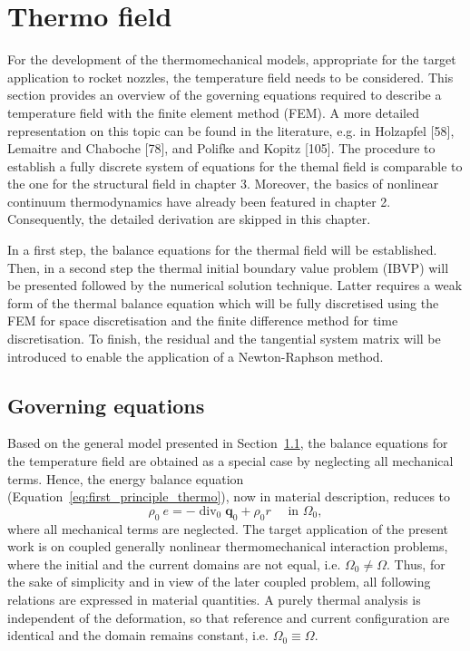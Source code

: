 \chapter{Thermo field}

For the development of the thermomechanical models, appropriate for the target application to rocket nozzles, the temperature field needs to be considered. This section provides an overview of the governing equations required to describe a temperature field with the finite element method (FEM). A more detailed representation on this topic can be found in the literature, e.g. in Holzapfel [58], Lemaitre and Chaboche [78], and Polifke and Kopitz [105]. The procedure to establish a fully discrete system of equations for the themal field is comparable to the one for the structural field in chapter 3. Moreover, the basics of nonlinear continuum thermodynamics have already been featured in chapter 2. Consequently, the detailed derivation are skipped in this chapter.

In a first step, the balance equations for the thermal field will be established. Then, in a second step the thermal initial boundary value problem (IBVP) will be presented followed by the numerical solution technique. Latter requires a weak form of the thermal balance equation which will be fully discretised using the FEM for space discretisation and the finite difference method for time discretisation. To finish, the residual and the tangential system matrix will be introduced to enable the application of a Newton-Raphson method.

\section{Governing equations}

Based on the general model presented in Section~\ref{}, the balance equations for the temperature field are obtained as a special case by neglecting all mechanical terms.
Hence, the energy balance equation (Equation~\eqref{eq:first_principle_thermo}), now in material description, reduces to
\begin{equation} \label{eq:strong_energy_eq}
\rho_0\ e=-\operatorname{div}_0 \bm q_0+\rho_0 r \quad \text { in } \Omega_0,
\end{equation}
where all mechanical terms are neglected.
The target application of the present work is on coupled generally nonlinear thermomechanical interaction problems, where the initial and the current domains are not equal, i.e. \(\Omega_{0} \neq \Omega\).
Thus, for the sake of simplicity and in view of the later coupled problem, all following relations are expressed in material quantities.
A purely thermal analysis is independent of the deformation, so that reference and current configuration are identical and the domain remains constant, i.e. \(\Omega_{0} \equiv \Omega\).

